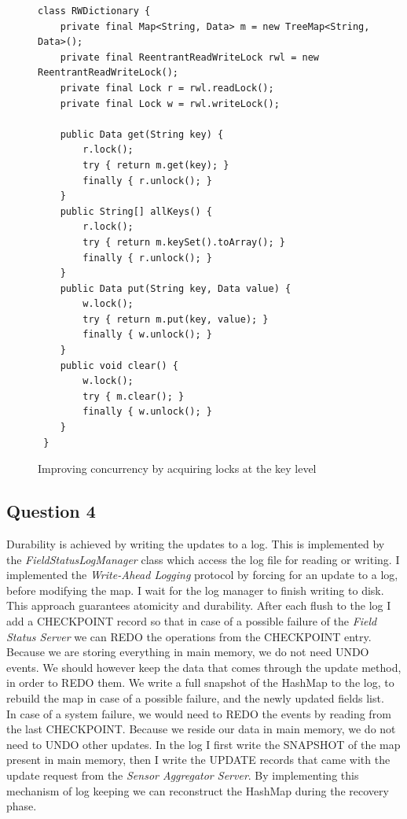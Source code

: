 \documentclass{article}      %
\begin{document}
\begin{figure}[htbp]
\begin{center}
\begin{lstlisting}
class RWDictionary {
    private final Map<String, Data> m = new TreeMap<String, Data>();
    private final ReentrantReadWriteLock rwl = new ReentrantReadWriteLock();
    private final Lock r = rwl.readLock();
    private final Lock w = rwl.writeLock();

    public Data get(String key) {
        r.lock();
        try { return m.get(key); }
        finally { r.unlock(); }
    }
    public String[] allKeys() {
        r.lock();
        try { return m.keySet().toArray(); }
        finally { r.unlock(); }
    }
    public Data put(String key, Data value) {
        w.lock();
        try { return m.put(key, value); }
        finally { w.unlock(); }
    }
    public void clear() {
        w.lock();
        try { m.clear(); }
        finally { w.unlock(); }
    }
 }
\end{lstlisting}
\caption{Improving concurrency by acquiring locks at the key level}
\label{Improving concurrency by acquiring locks at the key level}
\end{center}
\end{figure}



\subsection* {Question 4}

Durability is achieved by writing the updates to a log. This is implemented by the \emph{FieldStatusLogManager} class which access the log file for reading or writing. I implemented the \emph{Write-Ahead Logging} protocol by forcing for an update to a log, before modifying the map. I wait for the log manager to finish writing to disk. This approach guarantees atomicity and durability. After each flush to the log I add a CHECKPOINT record so that in case of a possible failure of the \emph{Field Status Server} we can REDO the operations from the CHECKPOINT entry. Because we are storing everything in main memory, we do not need UNDO events. We should however keep the data that comes through the update method, in order to REDO them. We write a full snapshot of the HashMap to the log, to rebuild the map in case of a possible failure, and the newly updated fields list.\\

In case of a system failure, we would need to REDO the events by reading from the last CHECKPOINT. Because we reside our data in main memory, we do not need to UNDO other updates. In the log I first write the SNAPSHOT of the map present in main memory, then I write the UPDATE records that came with the update request from the \emph{Sensor Aggregator Server}. By implementing this mechanism of log keeping we can reconstruct the HashMap during the recovery phase. \\
\end{document}
